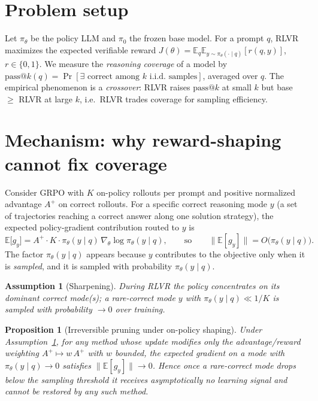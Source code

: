 \documentclass[11pt]{article}
\makeatletter
\newcommand{\passk}{\text{pass@}k}
\newtheorem{proposition}{Proposition}
\newtheorem{assumption}{Assumption}
\theoremstyle{definition}
\makeatother
\begin{document}
\section{Problem setup}
Let $\pi_\theta$ be the policy LLM and $\pi_0$ the frozen base model. For a prompt $q$, RLVR maximizes
the expected verifiable reward $J(\theta)=\mathbb{E}_{q}\mathbb{E}_{y\sim\pi_\theta(\cdot\mid q)}[r(q,y)]$,
$r\in\{0,1\}$. We measure the \emph{reasoning coverage} of a model by
$\passk(q)=\Pr[\exists\text{ correct among }k\text{ i.i.d.\ samples}]$, averaged over $q$. The
empirical phenomenon \citep{yue2025} is a \emph{crossover}: RLVR raises $\passk$ at small $k$ but base
$\ge$ RLVR at large $k$, i.e.\ RLVR trades coverage for sampling efficiency.

\section{Mechanism: why reward-shaping cannot fix coverage}
\label{sec:mech}
Consider GRPO with $K$ on-policy rollouts per prompt and positive normalized advantage $A^{+}$ on
correct rollouts. For a specific correct reasoning mode $y$ (a set of trajectories reaching a correct
answer along one solution strategy), the expected policy-gradient contribution routed to $y$ is
\begin{equation}
\mathbb{E}\big[g_y\big]
= A^{+}\cdot K\cdot \pi_\theta(y\mid q)\,\nabla_\theta\log\pi_\theta(y\mid q),
\qquad\text{so}\qquad
\big\lVert \mathbb{E}[g_y]\big\rVert = O\!\big(\pi_\theta(y\mid q)\big).
\label{eq:vanish}
\end{equation}
The factor $\pi_\theta(y\mid q)$ appears because $y$ contributes to the objective only when it is
\emph{sampled}, and it is sampled with probability $\pi_\theta(y\mid q)$.

\begin{assumption}[Sharpening]\label{ass:sharp}
During RLVR the policy concentrates on its dominant correct mode(s); a rare-correct mode $y$ with
$\pi_\theta(y\mid q)\ll 1/K$ is sampled with probability $\to 0$ over training.
\end{assumption}

\begin{proposition}[Irreversible pruning under on-policy shaping]\label{prop:prune}
Under Assumption~\ref{ass:sharp}, for any method whose update modifies only the advantage/reward
weighting $A^{+}\!\mapsto\! w\,A^{+}$ with $w$ bounded, the expected gradient on a mode with
$\pi_\theta(y\mid q)\to 0$ satisfies $\lVert\mathbb{E}[g_y]\rVert\to 0$. Hence once a rare-correct mode
drops below the sampling threshold it receives asymptotically no learning signal and cannot be
restored by any such method.
\end{proposition}
\end{document}
